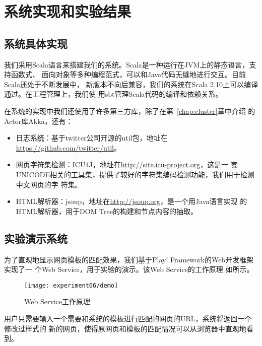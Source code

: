 
\chapter{系统实现和实验结果}
\label{chap:experiment}

\section{系统具体实现}
\label{sec:implementation}
我们采用Scala语言来搭建我们的系统。Scala是一种运行在JVM上的静态语言，支持函数式、
面向对象等多种编程范式，可以和Java代码无缝地进行交互。目前Scala还处于不断发展中，
新版本不向后兼容，我们的系统在Scala 2.10上可以编译通过。在工程管理上，我们使
用sbt管理Scala代码的编译和依赖关系。

在系统的实现中我们还使用了许多第三方库，除了在第~\ref{chap:cluster}章中介绍
的Actor库Akka，还有：
\begin{itemize}
\item 日志系统：基于twitter公司开源的util包，地址在
  \url{https://github.com/twitter/util}。
\item 网页字符集检测：ICU4J，地址在\url{http://site.icu-project.org}，这是一
  套UNICODE相关的工具集，提供了较好的字符集编码检测功能，我们用于检测中文网页的字
  符集。
\item HTML解析器：jsoup，地址在\url{http://jsoup.org}，是一个用Java语言实现
  的HTML解析器，用于DOM Tree的构建和节点内容的抽取。
\end{itemize}
\section{实验演示系统}
\label{sec:demo}
为了直观地显示网页模板的匹配效果，我们基于Play! Framework的Web开发框架实现了一
个Web Service，用于实验的演示。该Web Service的工作原理
如所示。
\begin{figure}
  \centering
  \texttt{[image: experiment06/demo]}
  \caption{Web Service工作原理}
  \label{experiment:fig:demo}
\end{figure}

用户只需要输入一个需要和系统的模板进行匹配的网页的URL，系统将返回一个修改过样式的
新的网页，使得原网页和模板的匹配情况可以从浏览器中直观地看到。
